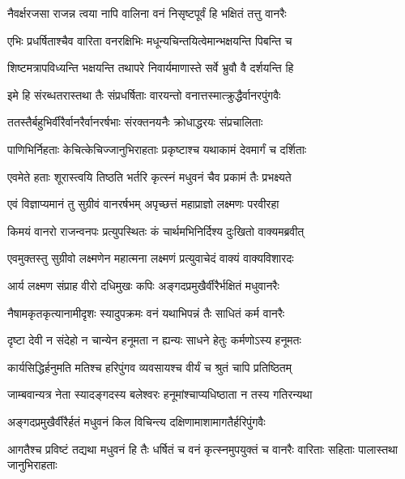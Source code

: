\twolineshloka
{नैवर्क्षरजसा राजन्न त्वया नापि वालिना}
{वनं निसृष्टपूर्वं हि भक्षितं तत्तु वानरैः} %

\twolineshloka
{एभिः प्रधर्षिताश्चैव वारिता वनरक्षिभिः}
{मधून्यचिन्तयित्वेमान्भक्षयन्ति पिबन्ति च} %

\twolineshloka
{शिष्टमत्रापविध्यन्ति भक्षयन्ति तथापरे}
{निवार्यमाणास्ते सर्वे भ्रुवौ वै दर्शयन्ति हि} %

\twolineshloka
{इमे हि संरब्धतरास्तथा तैः संप्रधर्षिताः}
{वारयन्तो वनात्तस्मात्क्रुद्धैर्वानरपुंगवैः} %

\twolineshloka
{ततस्तैर्बहुभिर्वीरैर्वानरैर्वानरर्षभाः}
{संरक्तनयनैः क्रोधाद्धरयः संप्रचालिताः} %

\twolineshloka
{पाणिभिर्निहताः केचित्केचिज्जानुभिराहताः}
{प्रकृष्टाश्च यथाकामं देवमार्गं च दर्शिताः} %

\twolineshloka
{एवमेते हताः शूरास्त्वयि तिष्ठति भर्तरि}
{कृत्स्नं मधुवनं चैव प्रकामं तैः प्रभक्ष्यते} %

\twolineshloka
{एवं विज्ञाप्यमानं तु सुग्रीवं वानरर्षभम्}
{अपृच्छत्तं महाप्राज्ञो लक्ष्मणः परवीरहा} %

\twolineshloka
{किमयं वानरो राजन्वनपः प्रत्युपस्थितः}
{कं चार्थमभिनिर्दिश्य दुःखितो वाक्यमब्रवीत्} %

\twolineshloka
{एवमुक्तस्तु सुग्रीवो लक्ष्मणेन महात्मना}
{लक्ष्मणं प्रत्युवाचेदं वाक्यं वाक्यविशारदः} %

\twolineshloka
{आर्य लक्ष्मण संप्राह वीरो दधिमुखः कपिः}
{अङ्गदप्रमुखैर्वीरैर्भक्षितं मधुवानरैः} %

\twolineshloka
{नैषामकृतकृत्यानामीदृशः स्यादुपक्रमः}
{वनं यथाभिपन्नं तैः साधितं कर्म वानरैः} %

\twolineshloka
{दृष्टा देवी न संदेहो न चान्येन हनूमता}
{न ह्यन्यः साधने हेतुः कर्मणोऽस्य हनूमतः} %

\twolineshloka
{कार्यसिद्धिर्हनुमति मतिश्च हरिपुंगव}
{व्यवसायश्च वीर्यं च श्रुतं चापि प्रतिष्ठितम्} %

\twolineshloka
{जाम्बवान्यत्र नेता स्यादङ्गदस्य बलेश्वरः}
{हनूमांश्चाप्यधिष्ठाता न तस्य गतिरन्यथा} %

\twolineshloka
{अङ्गदप्रमुखैर्वीरैर्हतं मधुवनं किल}
{विचिन्त्य दक्षिणामाशामागतैर्हरिपुंगवैः} %

\threelineshloka
{आगतैश्च प्रविष्टं तद्यथा मधुवनं हि तैः}
{धर्षितं च वनं कृत्स्नमुपयुक्तं च वानरैः}
{वारिताः सहिताः पालास्तथा जानुभिराहताः} %

